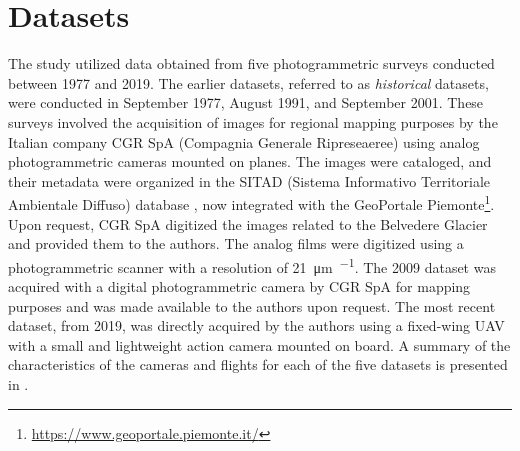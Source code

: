 

\section{Datasets}\label{sec:2:datasets}

The study utilized data obtained from five photogrammetric surveys conducted between 1977 and 2019. The earlier datasets, referred to as \textit{historical} datasets, were conducted in September 1977, August 1991, and September 2001. 
These surveys involved the acquisition of images for regional mapping purposes by the Italian company CGR SpA (Compagnia Generale Ripreseaeree) using analog photogrammetric cameras mounted on planes. 
The images were cataloged, and their metadata were organized in the SITAD (Sistema Informativo Territoriale Ambientale Diffuso) database \citep{Cipriano2005_SITAD}, now integrated with the GeoPortale Piemonte\footnote{\url{ https://www.geoportale.piemonte.it/}}.
Upon request, CGR SpA digitized the images related to the Belvedere Glacier and provided them to the authors. 
The analog films were digitized using a photogrammetric scanner with a resolution of \SI{21}{\micro\meter\per\pixel}. 
The 2009 dataset was acquired with a digital photogrammetric camera by CGR SpA for mapping purposes and was made available to the authors upon request.
The most recent dataset, from 2019, was directly acquired by the authors using a fixed-wing UAV with a small and lightweight action camera mounted on board. A summary of the characteristics of the cameras and flights for each of the five datasets is presented in .


